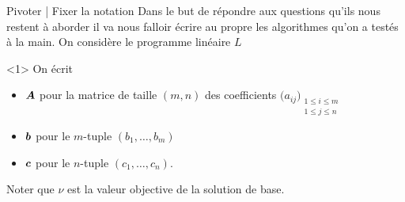 \documentclass[aspectratio = 169]{beamer}
\begin{document}
\begin{frame}{Pivoter | Fixer la notation}
  Dans le but de répondre aux questions qu'ils nous restent à aborder
  il va nous falloir écrire au propre les algorithmes qu'on a testés à
  la main. On considère le programme linéaire $L$
  \begin{figure}
    \end{figure}
    \begin{overlayarea}{\textwidth}{.3\textheight}
        \begin{onlyenv}<1>
          On écrit
            \begin{itemize}
            \item[\textbullet]
              $\boldsymbol{A}$ pour la matrice de taille $(m, n)$ des coefficients
              $\big(a_{ij}\big)_{\substack{1 \leq i \leq m \\ 1 \leq j \leq n}}$
            \item[\textbullet]
              $\boldsymbol{b}$ pour le $m$-tuple $(b_1, \ldots, b_m)$
            \item[\textbullet]
              $\boldsymbol{c}$ pour le $n$-tuple $(c_1, \ldots, c_n)$.
            \end{itemize}
            Noter que $\nu$ est la valeur objective de la solution de
            base.
        \end{onlyenv}

\end{overlayarea}
\end{frame}
\end{document}
